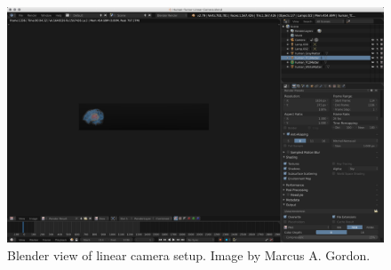 \begin{figure}[h]
  \centering
  \includegraphics[width=\linewidth]{img/linCam1.png}
  \caption{Blender view of linear camera setup. Image by Marcus A. Gordon.}
\end{figure}

